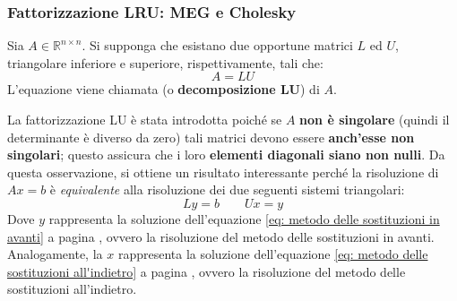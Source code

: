 \newpage

\subsubsection{Fattorizzazione LRU: MEG e Cholesky}

Sia $A \in \mathbb{R}^{n \times n}$. Si supponga che esistano due opportune matrici $L$ ed $U$, triangolare inferiore e superiore, rispettivamente, tali che:
\begin{equation}\label{eq: fattorizzazione LU}
    A = LU
\end{equation}
L'equazione viene chiamata  (o \textbf{decomposizione LU}) di $A$. 

\highspace
La fattorizzazione LU è stata introdotta poiché se $A$ \textbf{non è singolare} (quindi il determinante è diverso da zero) tali matrici devono essere \textbf{anch'esse non singolari}; questo assicura che i loro \textbf{elementi diagonali siano non nulli}. Da questa osservazione, si ottiene un risultato interessante perché la risoluzione di $Ax = b$ è \emph{equivalente} alla risoluzione dei due seguenti sistemi triangolari:
\begin{equation}
    Ly = b \hspace{2em} Ux = y
\end{equation}
Dove $y$ rappresenta la soluzione dell'equazione \ref{eq: metodo delle sostituzioni in avanti} a pagina \pageref{eq: metodo delle sostituzioni in avanti}, ovvero la risoluzione del metodo delle sostituzioni in avanti. Analogamente, la $x$ rappresenta la soluzione dell'equazione \ref{eq: metodo delle sostituzioni all'indietro} a pagina \pageref{eq: metodo delle sostituzioni all'indietro}, ovvero la risoluzione del metodo delle sostituzioni all'indietro.

